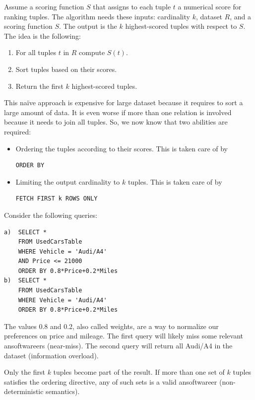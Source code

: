 \documentclass[12pt, a4paper]{report}
\begin{document}
    Assume a scoring function $S$ that assigns to each tuple $t$ a numerical score for ranking tuples. The algorithm needs these inputs: cardinality $k$, dataset $R$, and a scoring function $S$. The output is 
    the $k$ highest-scored tuples with respect to $S$. The idea is the following: 
    \begin{enumerate}
        \item For all tuples $t$ in $R$ compute $S(t)$. 
        \item Sort tuples based on their scores.
        \item Return the first $k$ highest-scored tuples. 
    \end{enumerate}
    This naïve approach is expensive for large dataset because it requires to sort a large amount of data. It is even worse if more than one relation is involved because it needs to join all tuples. So, 
    we now know that two abilities are required: 
    \begin{itemize}
        \item Ordering the tuples according to their scores. This is taken care of by 
            \begin{lstlisting}[style=SQL]
ORDER BY
            \end{lstlisting}
        \item Limiting the output cardinality to $k$ tuples. This is taken care of by 
            \begin{lstlisting}[style=SQL]
FETCH FIRST k ROWS ONLY
            \end{lstlisting}
    \end{itemize} 
    \begin{example}
        Consider the following queries: 
        \begin{lstlisting}[style=SQL]
a)  SELECT *
    FROM UsedCarsTable
    WHERE Vehicle = 'Audi/A4'
    AND Price <= 21000
    ORDER BY 0.8*Price+0.2*Miles
b)  SELECT *
    FROM UsedCarsTable
    WHERE Vehicle = 'Audi/A4'
    ORDER BY 0.8*Price+0.2*Miles
        \end{lstlisting}
        The values 0.8 and 0.2, also called weights, are a way to normalize our preferences on price and mileage.
        The first query will likely miss some relevant ansoftwareers (near-miss). The second query will return all Audi/A4 in the dataset (information overload).
    \end{example}
    Only the first $k$ tuples become part of the result. If more than one set of $k$ tuples satisfies the ordering directive, any of such sets is a valid ansoftwareer 
    (non-deterministic semantics). 
\end{document}
